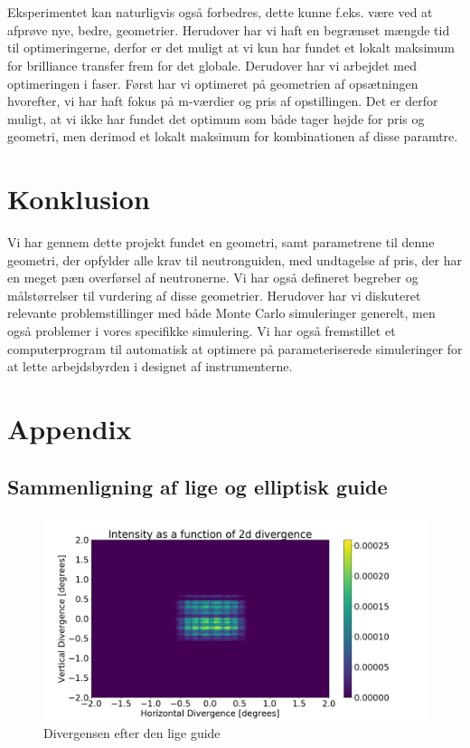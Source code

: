 \documentclass[12pt,oneside,a4paper]{article}
\begin{document}
{{{{{\\
\\
Eksperimentet kan naturligvis også forbedres, dette kunne f.eks. være ved at afprøve nye, bedre, geometrier. Herudover har vi haft en begrænset mængde tid til optimeringerne, derfor er det muligt at vi kun har fundet et lokalt maksimum for brilliance transfer frem for det globale. Derudover har vi arbejdet med optimeringen i faser. Først har vi optimeret på geometrien af opsætningen hvorefter, vi har haft fokus på m-værdier og pris af opstillingen. Det er derfor muligt, at vi ikke har fundet det optimum som både tager højde for pris og geometri, men derimod et lokalt maksimum for kombinationen af disse paramtre.

\section{Konklusion}
Vi har gennem dette projekt fundet en geometri, samt parametrene til denne geometri, der opfylder alle krav til neutronguiden, med undtagelse af pris, der har en meget pæn overførsel af neutronerne. Vi har også defineret begreber og målstørrelser til vurdering af disse geometrier. Herudover har vi diskuteret relevante problemstillinger med både Monte Carlo simuleringer generelt, men også problemer i vores specifikke simulering. Vi har også fremstillet et computerprogram til automatisk at optimere på parameteriserede simuleringer for at lette arbejdsbyrden i designet af instrumenterne.


\newpage

 

\newpage

\appendix
\section{Appendix}

\subsection{Sammenligning af lige og elliptisk guide}

\begin{figure}[H]
\centering
\includegraphics[width=1\textwidth]{div_straight_after.png}
\caption{Divergensen efter den lige guide}  \label{ap:div_straight_after}
\end{figure}


}}}}}
\end{document}
